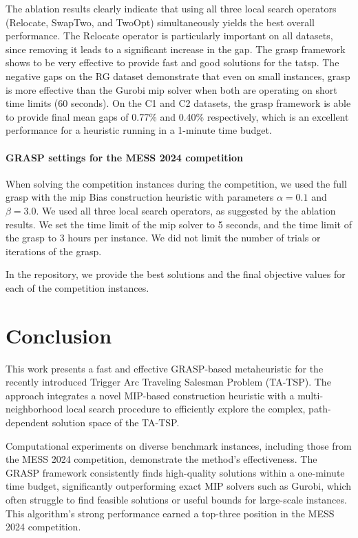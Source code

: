 \documentclass[twocolumn, switch]{article} %
\begin{document}
The ablation results clearly indicate that using all three local search operators (Relocate, SwapTwo, and TwoOpt) simultaneously yields the best overall performance.
The Relocate operator is particularly important on all datasets, since removing it leads to a significant increase in the gap.
The \gls{grasp} framework shows to be very effective to provide fast and good solutions for the \gls{tatsp}.
The negative gaps on the RG dataset demonstrate that even on small instances, \gls{grasp} is more effective than the Gurobi \gls{mip} solver when both are operating on short time limits (60 seconds).
On the C1 and C2 datasets, the \gls{grasp} framework is able to provide final mean gaps of 0.77\% and 0.40\% respectively, which is an excellent performance for a heuristic running in a 1-minute time budget.

\paragraph{GRASP settings for the MESS 2024 competition}
\label{sec:grasp_settings_for_competition}

When solving the competition instances during the competition, we used the full \gls{grasp} with the \gls{mip} Bias construction heuristic with parameters $\alpha = 0.1$ and $\beta = 3.0$.
We used all three local search operators, as suggested by the ablation results.
We set the time limit of the \gls{mip} solver to 5 seconds, and the time limit of the \gls{grasp} to 3 hours per instance.
We did not limit the number of trials or iterations of the \gls{grasp}.

In the repository, we provide the best solutions and the final objective values for each of the competition instances.


\section{Conclusion}
This work presents a fast and effective GRASP-based metaheuristic for the recently introduced Trigger Arc Traveling Salesman Problem (TA-TSP). The approach integrates a novel MIP-based construction heuristic with a multi-neighborhood local search procedure to efficiently explore the complex, path-dependent solution space of the TA-TSP.

Computational experiments on diverse benchmark instances, including those from the MESS 2024 competition, demonstrate the method’s effectiveness. The GRASP framework consistently finds high-quality solutions within a one-minute time budget, significantly outperforming exact MIP solvers such as Gurobi, which often struggle to find feasible solutions or useful bounds for large-scale instances. This algorithm’s strong performance earned a top-three position in the MESS 2024 competition.
\end{document}
